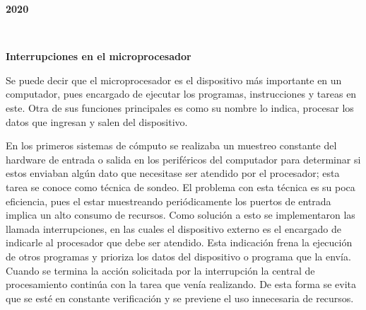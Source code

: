 \documentclass{article}
\begin{document}
\begin{center}
\bf{\sc\large 2020}\\
\end{center}\
\newpage
\begin{center}
\bf{\sc\LARGE Interrupciones en el microprocesador}\\
\end{center}
\vspace{50pt}
\large 
Se puede decir que el microprocesador es el dispositivo más importante en un computador, pues encargado de ejecutar los programas, instrucciones y tareas en este. Otra de sus funciones principales es como su nombre lo indica, procesar los datos que ingresan y salen del dispositivo.

\vspace{10pt}
En los primeros sistemas de cómputo se realizaba un muestreo constante del hardware de entrada o salida en los periféricos del computador para determinar si estos enviaban algún dato que necesitase ser atendido por el procesador; esta tarea se conoce como técnica de sondeo. 
El problema con esta técnica es su poca eficiencia, pues el estar muestreando periódicamente los puertos de entrada implica un alto consumo de recursos.
Como solución a esto se implementaron las llamada interrupciones, en las cuales el dispositivo externo es el encargado de indicarle al procesador que debe ser atendido. Esta indicación frena la ejecución de otros programas y prioriza los datos del dispositivo o programa que la envía. Cuando se termina la acción solicitada por la interrupción la central de procesamiento continúa con la tarea que venía realizando. De esta forma se evita que se esté en constante verificación y se previene el uso innecesaria de recursos. 
\end{document}
